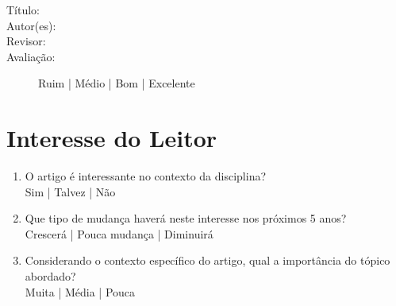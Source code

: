 \documentclass{UnBExam}%
\begin{document}
%

	\begin{description}%
		\item[Título:] %

		\item[Autor(es):] %

		\item[Revisor:] %

		\item[Avaliação:] %
		Ruim | Médio | Bom | Excelente%
	\end{description}%

	\section{Interesse do Leitor}%
	\begin{enumerate}
		\item O artigo é interessante no contexto da disciplina?\\%
		Sim | Talvez | Não

		\item Que tipo de mudança haverá neste interesse nos próximos 5 anos?\\%
		Crescerá | Pouca mudança | Diminuirá

		\item Considerando o contexto específico do artigo, qual a importância
		do tópico abordado?\\%
		Muita | Média | Pouca
	\end{enumerate}%
\end{document}
